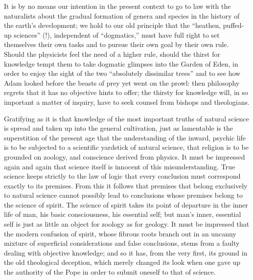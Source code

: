 \documentclass[12pt,a4paper,openany]{book}
\newcommand{\opage}[1]{\marginnote{\footnotesize\textit{[#1]}}}
\begin{document}
It is by no means our intention in the present context
to go to law with the naturalists about the gradual formation of genera
and species in the history of the earth's development;
we hold to our old principle that the
``heathen, puffed-up sciences'' (!), independent of ``dogmatics,''
must have full right to set themselves their own
tasks and to pursue their own goal by their own rule.
Should the physicists feel the need of a higher rule,
\setcounter{footnote}{0}%
\opage{491}should the thirst for knowledge tempt them to take dogmatic
glimpses into the Garden of Eden, in order to enjoy the sight of the
two ``absolutely dissimilar trees'' and to see how Adam looked
before the beasts of prey yet went on the prowl: then
philosophy regrets that it has no objective hints to offer; the
thirsty for knowledge will, in so important a matter of inquiry,
have to seek counsel from bishops and theologians.

Gratifying as it is that knowledge of the
most important truths of natural science is spread and taken up into the general
cultivation, just as lamentable is the superstition of the present age
that the understanding of the inward, psychic life
is to be subjected to a scientific yardstick of natural science, that religion
is to be grounded on zoology, and conscience derived
from physics. It must be impressed again and again that
science itself is innocent of this misunderstanding. True
science keeps strictly to the law of logic that
every conclusion must correspond exactly to its premises.
From this it follows that premises that belong exclusively to natural science
cannot possibly lead to conclusions whose premises
belong to the science of spirit. The science of spirit takes its point of departure
in the inner life of man, his basic consciousness, his essential
self; but man's inner, essential self is just as
little an object for zoology as for geology. It
must be impressed that the modern confusion of spirit, whose
fibrous roots branch out in an uncanny mixture of superficial
considerations and false conclusions, stems from
a faulty dealing with objective knowledge; and so it has, from
the very first, its ground in the old theological deception,
which merely changed its look when one gave up the authority of the Pope
in order to submit oneself to that of science.
\end{document}
